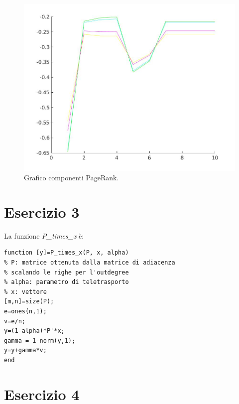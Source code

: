 \documentclass[11pt,a4paper,twoside,openright,titlepage,
                           headinclude,footinclude,BCOR5mm,
                           numbers=noenddot,cleardoublepage=empty,
                           tablecaptionabove]{scrbook}
\begin{document}
\begin{figure}[h!]
\begin{center}
\includegraphics[width=\textwidth]{figs/pageplot.jpg}
\caption{Grafico componenti PageRank.}
\end{center}
\end{figure}

\newpage
\section{Esercizio 3}
La funzione \emph{P\_times\_x} è:
\begin{lstlisting}[frame=trBL]
function [y]=P_times_x(P, x, alpha)
% P: matrice ottenuta dalla matrice di adiacenza
% scalando le righe per l'outdegree
% alpha: parametro di teletrasporto
% x: vettore
[m,n]=size(P);
e=ones(n,1);
v=e/n;
y=(1-alpha)*P'*x;
gamma = 1-norm(y,1);
y=y+gamma*v;
end
\end{lstlisting}

\section{Esercizio 4}
\end{document}
